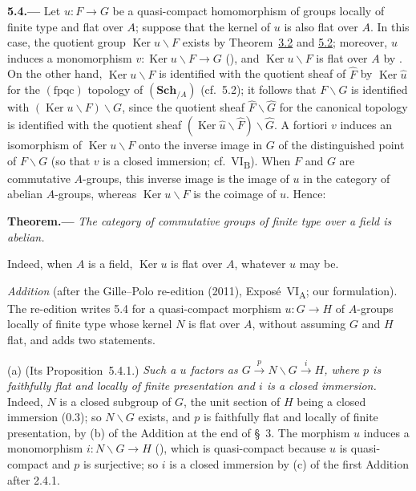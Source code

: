 
\medskip
{}\label{par:sga3-VIA-5.4}%
\noindent\textbf{5.4.---}
Let \(u:F\to G\) be a quasi-compact homomorphism of groups locally of
finite type and flat over \(A\); suppose that the kernel of \(u\) is also
flat over \(A\). In this case, the quotient group
\(\operatorname{Ker}u\backslash F\) exists by Theorem~\hyperref[thm:sga3-VIA-3.2]{3.2} and
\hyperref[par:sga3-VIA-5.2]{5.2}; moreover, \(u\) induces a monomorphism
\(v:\operatorname{Ker}u\backslash F\to G\)
(), and \(\operatorname{Ker}u\backslash F\) is flat
over \(A\) by . On the other hand,
\(\operatorname{Ker}u\backslash F\) is identified with the quotient sheaf of
\(\widehat F\) by \(\operatorname{Ker}\widehat u\) for the \((\mathrm{fpqc})\)
topology of \((\mathbf{Sch}_{/A})\) (cf.\ 5.2); it follows that
\(F\backslash G\) is identified with
\((\operatorname{Ker}u\backslash F)\backslash G\), since the quotient sheaf
\(\widehat F\backslash\widehat G\) for the canonical topology is identified with
the quotient sheaf \((\operatorname{Ker}\widehat u\backslash\widehat F)\backslash\widehat G\).
A fortiori \(v\) induces an isomorphism of \(\operatorname{Ker}u\backslash F\)
onto the inverse image in \(G\) of the distinguished point of
\(F\backslash G\) (so that \(v\) is a closed immersion; cf.\
VI\textsubscript{B}). When \(F\) and \(G\) are commutative \(A\)-groups,
this inverse image is the image of \(u\) in the category of abelian
\(A\)-groups, whereas \(\operatorname{Ker}u\backslash F\) is the coimage
of \(u\). Hence:

\medskip
{}\label{thm:sga3-VIA-5.4.2}%
\noindent\textbf{Theorem.---}
\emph{The category of commutative groups of finite type over a field is
abelian.}

Indeed, when \(A\) is a field, \(\operatorname{Ker}u\) is flat over \(A\),
whatever \(u\) may be.

\medskip\noindent
\emph{Addition} (after the Gille--Polo re-edition (2011), Exposé~VI\textsubscript{A}; our
formulation). The re-edition writes 5.4 for a quasi-compact morphism \(u\colon G\to H\) of
\(A\)-groups locally of finite type whose kernel \(N\) is flat over \(A\), without assuming \(G\)
and \(H\) flat, and adds two statements.

\label{prop:sga3-VIA-5.4.1}%
(a) (Its Proposition~5.4.1.) \emph{Such a \(u\) factors as
\(G\xrightarrow{\;p\;}N\backslash G\xrightarrow{\;i\;}H\), where \(p\) is faithfully flat and
locally of finite presentation and \(i\) is a closed immersion.} Indeed, \(N\) is a closed subgroup
of \(G\), the unit section of \(H\) being a closed immersion (0.3); so \(N\backslash G\) exists, and
\(p\) is faithfully flat and locally of finite presentation, by (b) of the Addition at the end of
\S~3. The morphism \(u\) induces a monomorphism \(i\colon N\backslash G\to H\)
(\SGARefLink{sga3:iv:remark:5:2:6}{IV, 5.2.6}), which is quasi-compact because \(u\) is quasi-compact
and \(p\) is surjective; so \(i\) is a closed immersion by (c) of the first Addition after 2.4.1.

